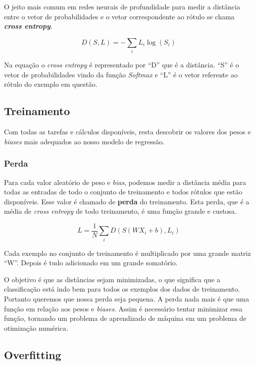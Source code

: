 O jeito mais comum em redes neurais de profundidade para medir a
distância entre o vetor de probabilidades e o vetor correspondente ao
rótulo se chama {\bf \emph{cross entropy}}.

\begin{equation}
   D(S,L) = - \displaystyle\sum_{i}L_i  {\log (S_i)}
\end{equation}

Na equação o \textit{cross entropy} é representado por ``D'' que é a
distância. ``S'' é o vetor de probabilidades vindo da função
\textit{Softmax} e ``L'' é o vetor referente ao rótulo do exemplo em
questão.

\subsection{Treinamento}

Com todas as tarefas e cálculos disponíveis, resta descobrir os
valores dos pesos e \textit{biases} mais adequados ao nosso modelo de
regressão.

\subsubsection{Perda}

Para cada valor aleatório de peso e \textit{bias}, podemos medir a
distância média para todas as entradas de todo o conjunto de
treinamento e todos rótulos que estão disponíveis. Esse valor é
chamado de {\bf perda} do treinamento. Esta perda, que é a média de
\textit{cross entropy} de todo treinamento, é uma função grande e
custosa.

\begin{equation}
  L = \displaystyle\frac{1}{N}\displaystyle\sum_iD(S(WX_i + b), L_i)
\end{equation}

Cada exemplo no conjunto de treinamento é multiplicado por uma grande
matriz ``W''. Depois é tudo adicionado em um grande somatório.

O objetivo é que as distâncias sejam minimizadas, o que significa que a
classificação está indo bem para todos os exemplos dos dados de
treinamento. Portanto queremos que nossa perda seja pequena. A
perda nada mais é que uma função em relação aos pesos e
\textit{biases}. Assim é necessário tentar minimizar essa função,
tornando um problema de aprendizado de máquina em um problema de
otimização numérica.

\subsection{Overfitting}


